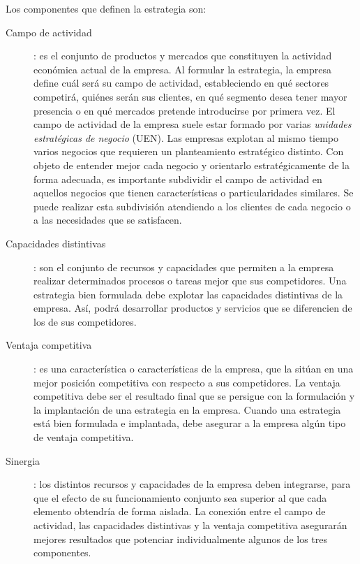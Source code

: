 \documentclass[10pt,a4paper,spanish]{report}
\begin{document}
                  Los componentes que definen la estrategia son:
                  \begin{description}
                        \item[Campo de actividad]: es el conjunto de productos y mercados que constituyen la actividad económica actual de la empresa. Al formular la estrategia, la empresa define cuál será su campo de actividad, estableciendo en qué sectores competirá, quiénes serán sus clientes, en qué segmento desea tener mayor presencia o en qué mercados pretende introducirse por primera vez. El campo de actividad de la empresa suele estar formado por varias \textit{\textcolor[rgb]{0.4,0.9,0.6}{unidades estratégicas de negocio}} (UEN). Las empresas explotan al mismo tiempo varios negocios que requieren un planteamiento estratégico distinto. Con objeto de entender mejor cada negocio y orientarlo estratégicamente de la forma adecuada, es importante subdividir el campo de actividad en aquellos negocios que tienen características o particularidades similares. Se puede realizar esta subdivisión atendiendo a los clientes de cada negocio o a las necesidades que se satisfacen.
                        
                        \item[Capacidades distintivas]: son el conjunto de recursos y capacidades que permiten a la empresa realizar determinados procesos o tareas mejor que sus competidores. Una estrategia bien formulada debe explotar las capacidades distintivas de la empresa. Así, podrá desarrollar productos y servicios que se diferencien de los de sus competidores.

                        \item[Ventaja competitiva]: es una característica o características de la empresa, que la sitúan en una mejor posición competitiva con respecto a sus competidores. La ventaja competitiva debe ser el resultado final que se persigue con la formulación y la implantación de una estrategia en la empresa. Cuando una estrategia está bien formulada e implantada, debe asegurar a la empresa algún tipo de ventaja competitiva.

                        \item[Sinergia]: los distintos recursos y capacidades de la empresa deben integrarse, para que el efecto de su funcionamiento conjunto sea superior al que cada elemento obtendría de forma aislada. La conexión entre el campo de actividad, las capacidades distintivas y la ventaja competitiva asegurarán mejores resultados que potenciar individualmente algunos de los tres componentes.
                  \end{description}
\end{document}

